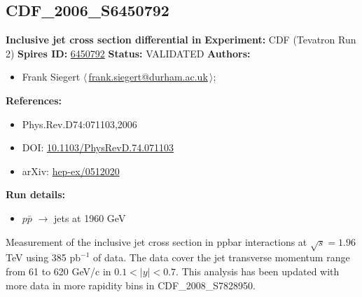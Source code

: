 \subsection[CDF\_2006\_S6450792]{CDF\_2006\_S6450792\,\cite{Abulencia:2005yg}}
\textbf{Inclusive jet cross section differential in \pT}\newline
\textbf{Experiment:} CDF (Tevatron Run 2) \newline
\textbf{Spires ID:} \href{http://www.slac.stanford.edu/spires/find/hep/www?rawcmd=key+6450792}{6450792}\newline
\textbf{Status:} VALIDATED\newline
\textbf{Authors:}
\begin{itemize}
  \item Frank Siegert $\langle\,$\href{mailto:frank.siegert@durham.ac.uk}{frank.siegert@durham.ac.uk}$\,\rangle$;
\end{itemize}
\textbf{References:}
\begin{itemize}
  \item Phys.Rev.D74:071103,2006
  \item DOI: \href{http://dx.doi.org/10.1103/PhysRevD.74.071103}{10.1103/PhysRevD.74.071103}
  \item arXiv: \href{http://arxiv.org/abs/hep-ex/0512020}{hep-ex/0512020}
\end{itemize}
\textbf{Run details:}
\begin{itemize}

  \item $p\bar{p}$ \ensuremath{\to} jets at 1960 GeV\end{itemize}

\noindent Measurement of the inclusive jet cross section in ppbar interactions at $\sqrt{s}=1.96$ TeV using 385 $\mathrm{pb}^{-1}$ of data. The data cover the jet transverse momentum range from 61 to 620 GeV/c in $0.1 < |y| < 0.7$. This analysis has been updated with more data in more rapidity bins in CDF_2008_S7828950.

\clearpage


\clearpage

